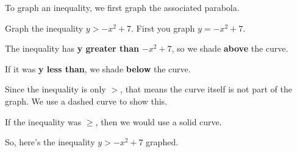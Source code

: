 
To graph an inequality, we first graph the associated parabola.

\begin{example}
  \label{exm:graphing_inequality}

  Graph the inequality $y > -x^{2} + 7$. First you graph $y = -x^{2} + 7.$

  The inequality has  \textbf{y greater than} $-x^{2} + 7$, so we shade
  \textbf{above} the curve.

  If it was \textbf{y less than}, we shade \textbf{below} the curve.

  Since the inequality is only $>$, that means the curve itself is not part of
  the graph. We use a dashed curve to show this.

  If the inequality was $\ge$, then we would use a solid curve.

  So, here's the inequality $y > -x^{2} + 7$ graphed.

  \begin{figure}[H]
    \centering
    \label{fig:inequality}
  \end{figure}
\end{example}

\newpage
